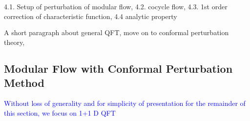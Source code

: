 \documentclass[a4paper,11pt]{article}
\theoremstyle{definition}
\newcommand{\NL}[1]{\textcolor{blue}{#1}}
\begin{document}

4.1. Setup of perturbation of modular flow, 4.2. cocycle flow, 4.3. 1st order correction of characteristic function, 4.4 analytic property 

A short paragraph about general QFT, move on to conformal perturbation theory, %
\subsection{Modular Flow with Conformal Perturbation Method}

\NL{Without loss of generality and for simplicity of presentation for the remainder of this section, we focus on 1+1 D QFT}
\end{document}
